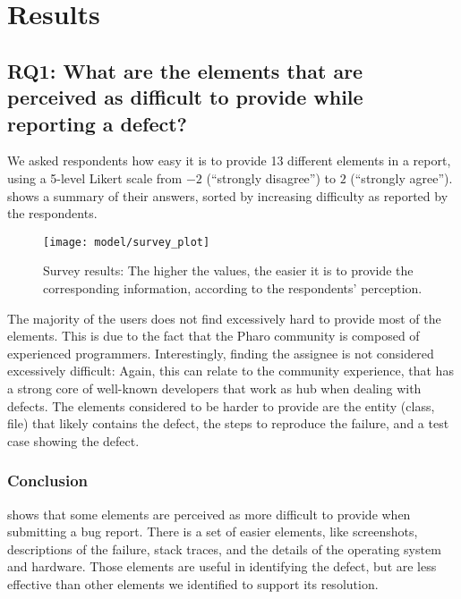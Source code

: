 \section{Results}\label{sec:model-approach}

\subsection*{RQ1: What are the elements that are perceived as difficult to provide while reporting a defect?}

We asked respondents how easy it is to provide 13 different elements in a report, using a 5-level Likert scale from $-2$ (``strongly disagree'') to $2$ (``strongly agree'').
 shows a summary of their answers, sorted by increasing difficulty as reported by the respondents.
%
\begin{figure}[t]
\centering
\texttt{[image: model/survey\_plot]}
\caption{Survey results: The higher the values, the easier it is to provide the corresponding information, according to the respondents' perception.}
\label{fig:survey}
\end{figure}
%
The majority of the users does not find excessively hard to provide most of the elements.
This is due to the fact that the Pharo community is composed of experienced programmers.
Interestingly, finding the assignee is not considered excessively difficult: Again, this can relate to the community experience, that has a strong core of well-known developers that work as hub when dealing with defects.
The elements considered to be harder to provide are the entity (\eg class, file) that likely contains the defect, the steps to reproduce the failure, and a test case showing the defect.


\subsubsection{Conclusion}

 shows that some elements are perceived as more difficult to provide when submitting a bug report.
There is a set of easier elements, like screenshots, descriptions of the failure, stack traces, and the details of the operating system and hardware.
Those elements are useful in identifying the defect, but are less effective than other elements we identified to support its resolution.


